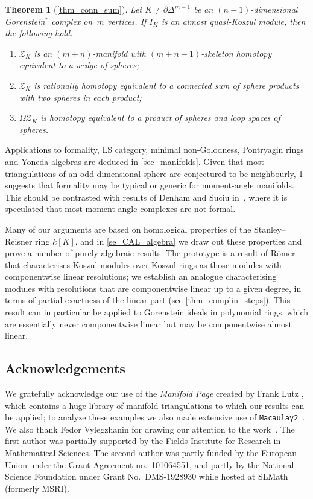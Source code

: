 \documentclass[a4paper,10pt]{amsart}
\newtheorem{theorema}{Theorem}
\theoremstyle{definition}
\theoremstyle{remark}
\begin{document}
\begin{theorema}[\cref{thm_conn_sum}] \label{thm_introB}
Let $K\neq\partial\Delta^{m-1}$ be an $(n-1)$-dimensional Gorenstein$^*$ complex on~$m$ vertices. If $I_K$ is an almost quasi-Koszul module, then the following hold:
\begin{enumerate}[label={\normalfont(\arabic*)}]
\item $\mathcal{Z}_K$ is an $(m+n)$-manifold with $(m+n-1)$-skeleton homotopy equivalent to a wedge of spheres;
\item $\mathcal{Z}_K$ is rationally homotopy equivalent to a connected sum of sphere products with two spheres in each product;
\item $\Omega\mathcal{Z}_K$ is homotopy equivalent to a product of spheres and loop spaces of spheres.
\end{enumerate}
\end{theorema}

Applications to formality, LS category, minimal non-Golodness, Pontryagin rings and Yoneda algebras are deduced in \cref{sec_manifolds}. Given that most triangulations of an odd-dimensional sphere are conjectured to be neighbourly, \cref{thm_introB} suggests that formality may be typical or generic for moment-angle manifolds. This should be contrasted with results of Denham and Suciu in~\cite[\S8.3]{DS}, where it is speculated that most moment-angle complexes are not formal.

Many of our arguments are based on homological properties of the Stanley--Reisner ring $k[K]$, and in \cref{se_CAL_algebra} we draw out these properties and prove a number of purely algebraic results. The prototype is a result of R\"omer \cite{R} that characterises Koszul modules over Koszul rings as those modules with componentwise linear resolutions; we establish an analogue characterising modules with resolutions that are componentwise linear up to a given degree, in terms of partial exactness of the linear part (see \cref{thm_complin_steps}). This result can in particular be applied to Gorenstein ideals in polynomial rings, which are essentially never componentwise linear but may be componentwise almost linear.


\subsection*{Acknowledgements} 
We gratefully acknowledge our use of the \emph{Manifold Page} created by Frank Lutz \cite{ManifoldPage}, which contains a huge library of manifold triangulations to which our results can be applied; to analyze these examples we also made extensive use of {\tt Macaulay2}~\cite{GS}. We also thank Fedor Vylegzhanin for drawing our attention to the work~\cite{CS}. The first author was partially supported by the Fields Institute for Research in Mathematical Sciences. The second author was partly funded by the European Union under the Grant Agreement no.\ 101064551, and partly by the National Science Foundation under Grant No.\ DMS-1928930 while hosted at SLMath (formerly MSRI).
\end{document}
